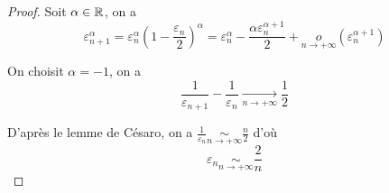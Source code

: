 \begin{proof}
    Soit $\alpha\in\mathbb{R}$, on a 
    \begin{equation}
        \varepsilon_{n+1}^{\alpha}=\varepsilon_{n}^{\alpha}\left(1-\frac{\varepsilon_{n}}{2}\right)^{\alpha}=\varepsilon_{n}^{\alpha}-\frac{\alpha\varepsilon_{n}^{\alpha+1}}{2}+\underset{n\to+\infty}{o}\left(\varepsilon_{n}^{\alpha+1}\right)
    \end{equation}

    On choisit $\alpha=-1$, on a
    \begin{equation}
        \frac{1}{\varepsilon_{n+1}}-\frac{1}{\varepsilon_{n}}\xrightarrow[n\to+\infty]{}\frac{1}{2}
    \end{equation}

    D'après le lemme de Césaro, on a $\frac{1}{\varepsilon_{n}}\underset{n\to+\infty}{\sim}\frac{n}{2}$ d'où 
    \begin{equation}
        \boxed{\varepsilon_{n}\underset{n\to+\infty}{\sim}\frac{2}{n}}
    \end{equation}
\end{proof}

